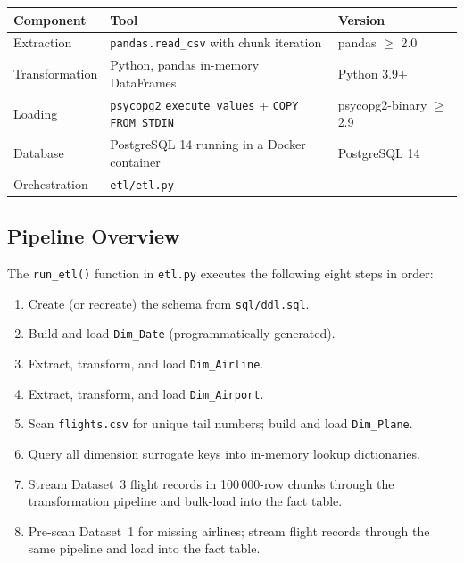 \documentclass[12pt,a4paper]{article}
\begin{document}
\begin{center}
\begin{tabular}{lll}
\toprule
\textbf{Component} & \textbf{Tool} & \textbf{Version} \\
\midrule
Extraction     & \texttt{pandas.read\_csv} with chunk iteration & pandas $\geq$ 2.0 \\
Transformation & Python, pandas in-memory DataFrames            & Python 3.9+ \\
Loading        & \texttt{psycopg2} \texttt{execute\_values} + \texttt{COPY FROM STDIN} & psycopg2-binary $\geq$ 2.9 \\
Database       & PostgreSQL 14 running in a Docker container    & PostgreSQL 14 \\
Orchestration  & \texttt{etl/etl.py}                            & — \\
\bottomrule
\end{tabular}
\end{center}

\subsection{Pipeline Overview}

The \texttt{run\_etl()} function in \texttt{etl.py} executes the following
eight steps in order:

\begin{enumerate}
    \item Create (or recreate) the schema from \texttt{sql/ddl.sql}.
    \item Build and load \texttt{Dim\_Date} (programmatically generated).
    \item Extract, transform, and load \texttt{Dim\_Airline}.
    \item Extract, transform, and load \texttt{Dim\_Airport}.
    \item Scan \texttt{flights.csv} for unique tail numbers; build and load
          \texttt{Dim\_Plane}.
    \item Query all dimension surrogate keys into in-memory lookup
          dictionaries.
    \item Stream Dataset~3 flight records in 100\,000-row chunks through the
          transformation pipeline and bulk-load into the fact table.
    \item Pre-scan Dataset~1 for missing airlines; stream flight records
          through the same pipeline and load into the fact table.
\end{enumerate}
\end{document}
